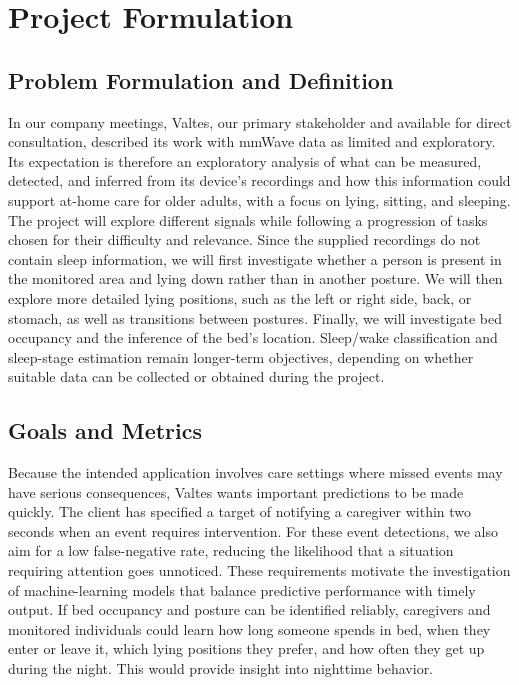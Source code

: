 \section{Project Formulation}

\subsection{Problem Formulation and Definition}
In our company meetings, Valtes, our primary stakeholder and available for direct consultation, described its work with mmWave data as limited and exploratory. Its expectation is therefore an exploratory analysis of what can be measured, detected, and inferred from its device's recordings and how this information could support at-home care for older adults, with a focus on lying, sitting, and sleeping. The project will explore different signals while following a progression of tasks chosen for their difficulty and relevance. Since the supplied recordings do not contain sleep information, we will first investigate whether a person is present in the monitored area and lying down rather than in another posture. We will then explore more detailed lying positions, such as the left or right side, back, or stomach, as well as transitions between postures. Finally, we will investigate bed occupancy and the inference of the bed's location. Sleep/wake classification and sleep-stage estimation remain longer-term objectives, depending on whether suitable data can be collected or obtained during the project.

\subsection{Goals and Metrics}
Because the intended application involves care settings where missed events may have serious consequences, Valtes wants important predictions to be made quickly. The client has specified a target of notifying a caregiver within two seconds when an event requires intervention. For these event detections, we also aim for a low false-negative rate, reducing the likelihood that a situation requiring attention goes unnoticed. These requirements motivate the investigation of machine-learning models that balance predictive performance with timely output. If bed occupancy and posture can be identified reliably, caregivers and monitored individuals could learn how long someone spends in bed, when they enter or leave it, which lying positions they prefer, and how often they get up during the night. This would provide insight into nighttime behavior.


